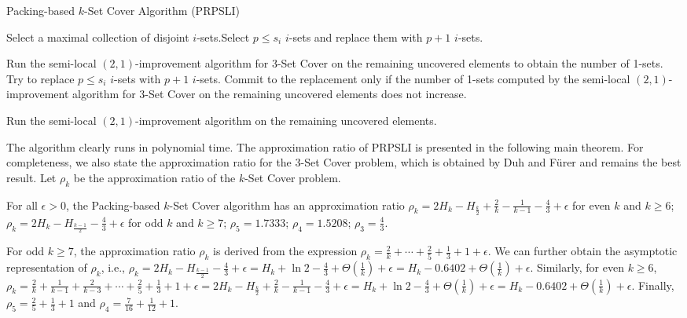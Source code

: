 \documentclass[runningheads,a4paper]{llncs}
\numberwithin{equation}{section}
\begin{document}
\begin{algorithm}
\caption{Packing-based $k$-Set Cover Algorithm (PRPSLI)}
\begin{algorithmic}

\STATE {}
 \STATE Select a maximal collection of disjoint $i$-sets.\REPEAT \STATE Select $p\leq s_i$ $i$-sets and replace them with $p+1$ $i$-sets.  \ENDFOR

\STATE {}
\STATE Run the semi-local $(2,1)$-improvement algorithm for 3-Set Cover on the remaining uncovered elements to obtain the number of 1-sets.
\REPEAT \STATE Try to replace $p\leq s_i$ $i$-sets with $p+1$ $i$-sets. Commit to the replacement only if the number of 1-sets computed by the semi-local $(2,1)$-improvement algorithm for 3-Set Cover on the remaining uncovered elements does not increase.  \ENDFOR

\STATE {}
\STATE Run the semi-local $(2,1)$-improvement algorithm on the remaining uncovered elements.

\end{algorithmic}
\end{algorithm}


The algorithm clearly runs in polynomial time. The approximation ratio of PRPSLI is presented in the following main theorem. For completeness, we also state the approximation ratio for the 3-Set Cover problem, which is obtained by Duh and F\"{u}rer \cite{furer} and remains the best result. Let $\rho_k$ be the approximation ratio of the $k$-Set Cover problem.

\begin{theorem}[Main]
For all $\epsilon >0$, the Packing-based $k$-Set Cover algorithm has an approximation ratio $\rho_k=2H_k-H_{\frac{k}{2}}+\frac{2}{k}-\frac{1}{k-1}-\frac{4}{3}+\epsilon$ for even $k$ and $k\geq 6$; $\rho_k=2H_k-H_{\frac{k-1}{2}}-\frac{4}{3}+\epsilon$ for odd $k$ and $k\geq 7$; $\rho_5=1.7333$;
$\rho_4=1.5208$; $\rho_3=\frac{4}{3}$.
\end{theorem}

\begin{remark}
For odd $k\geq 7$, the approximation ratio $\rho_k$ is derived from the expression $\rho_k=\frac{2}{k}+\cdots+\frac{2}{5}+\frac{1}{3}+1+\epsilon$. We can further obtain the asymptotic representation of $\rho_k$, i.e., $\rho_k=2H_k-H_{\frac{k-1}{2}}-\frac{4}{3}+\epsilon=H_k+\ln 2-\frac{4}{3}+\Theta(\frac{1}{k})+\epsilon=H_k-0.6402+\Theta(\frac{1}{k})+\epsilon$. Similarly, for even $k\geq 6$, $\rho_k=\frac{2}{k}+\frac{1}{k-1}+\frac{2}{k-3}+\cdots+\frac{2}{5}+\frac{1}{3}+1+\epsilon=2H_k-H_{\frac{k}{2}}+\frac{2}{k}-\frac{1}{k-1}-\frac{4}{3}+\epsilon=H_k+\ln 2-\frac{4}{3}+\Theta(\frac{1}{k})+\epsilon=H_k-0.6402+\Theta(\frac{1}{k})+\epsilon$.
Finally, $\rho_{5} = \frac{2}{5} + \frac{1}{3} + 1$ and $\rho_{4} =  \frac{7}{16} + \frac{1}{12} + 1$.
\end{remark}
\end{document}
